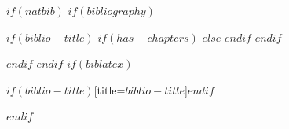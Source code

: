 $if(natbib)$
$if(bibliography)$

$if(biblio-title)$
$if(has-chapters)$
\renewcommand\bibname{$biblio-title$}
$else$
\renewcommand\refname{$biblio-title$}
$endif$
$endif$



$endif$
$endif$
$if(biblatex)$

\printbibliography$if(biblio-title)$[title=$biblio-title$]$endif$


$endif$